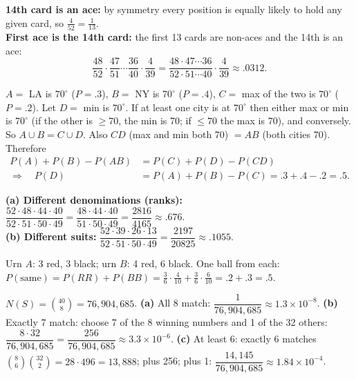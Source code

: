 \documentclass[11pt]{article}
\begin{document}
\begin{exbox}
\textbf{14th card is an ace:} by symmetry every position is equally likely to hold any given card, so $\tfrac4{52}=\boxed{\tfrac1{13}}$.\\
\textbf{First ace is the 14th card:} the first 13 cards are non-aces and the 14th is an ace:
\[ \frac{48}{52}\cdot\frac{47}{51}\cdots\frac{36}{40}\cdot\frac4{39}=\frac{48\cdot47\cdots36}{52\cdot51\cdots40}\cdot\frac4{39}\approx\boxed{.0312}. \]
\end{exbox}

\begin{exbox}
$A=$ LA is $70^\circ$ ($P=.3$), $B=$ NY is $70^\circ$ ($P=.4$), $C=$ max of the two is $70^\circ$ ($P=.2$). Let $D=$ min is $70^\circ$. If at least one city is at $70^\circ$ then either max or min is $70^\circ$ (if the other is $\ge70$, the min is 70; if $\le70$ the max is 70), and conversely. So $A\cup B=C\cup D$. Also $CD$ (max and min both 70) $=AB$ (both cities 70). Therefore
\begin{align*}
P(A)+P(B)-P(AB)&=P(C)+P(D)-P(CD)\\
\Rightarrow\quad P(D)&=P(A)+P(B)-P(C)=.3+.4-.2=\boxed{.5}.
\end{align*}
\end{exbox}

\begin{exbox}
\textbf{(a) Different denominations (ranks):} $\dfrac{52\cdot48\cdot44\cdot40}{52\cdot51\cdot50\cdot49}=\dfrac{48\cdot44\cdot40}{51\cdot50\cdot49}=\dfrac{2816}{4165}\approx\boxed{.676}$.\\
\textbf{(b) Different suits:} $\dfrac{52\cdot39\cdot26\cdot13}{52\cdot51\cdot50\cdot49}=\dfrac{2197}{20825}\approx\boxed{.1055}$.
\end{exbox}

\begin{exbox}
Urn $A$: 3 red, 3 black; urn $B$: 4 red, 6 black. One ball from each: $P(\text{same})=P(RR)+P(BB)=\tfrac36\cdot\tfrac4{10}+\tfrac36\cdot\tfrac6{10}=.2+.3=\boxed{.5}$.
\end{exbox}

\begin{exbox}
$N(S)=\binom{40}8=76{,}904{,}685$. \textbf{(a)} All 8 match: $\dfrac1{76{,}904{,}685}\approx1.3\times10^{-8}$. \textbf{(b)} Exactly 7 match: choose 7 of the 8 winning numbers and 1 of the 32 others: $\dfrac{8\cdot32}{76{,}904{,}685}=\dfrac{256}{76{,}904{,}685}\approx3.3\times10^{-6}$. \textbf{(c)} At least 6: exactly 6 matches $\binom86\binom{32}2=28\cdot496=13{,}888$; plus 256; plus 1: $\dfrac{14{,}145}{76{,}904{,}685}\approx1.84\times10^{-4}$.
\end{exbox}
\end{document}
